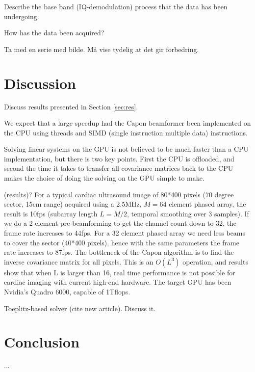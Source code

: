 \documentclass[journal]{IEEEtran}
\begin{document}
Describe the base band (IQ-demodulation) process that the data has been undergoing.

How has the data been acquired?

Ta med en serie med bilde. Må vise tydelig at det gir forbedring. 

\section{Discussion}\label{sec:dis}
Discuss results presented in Section \ref{sec:res}.

We expect that a large speedup had the Capon beamformer been implemented on the CPU using threads and SIMD (single instruction multiple data) instructions. 

Solving linear systems on the GPU is not believed to be much faster than a CPU implementation, but there is two key points. First the CPU is offloaded, and second the time it takes to transfer all covariance matrices back to the CPU makes the choice of doing the solving on the GPU simple to make.

(results)?
For a typical cardiac ultrasound image of 80*400 pixels (70 degree sector, 15cm range) acquired using a 2.5MHz, $M=64$ element phased array, the result is 10fps (subarray length $L=M/2$, temporal smoothing over 3 samples). If we do a 2-element pre-beamforming to get the channel count down to 32, the frame rate increases to 44fps. For a 32 element phased array we need less beams to cover the sector (40*400 pixels), hence with the same parameters the frame rate increases to 87fps. The bottleneck of the Capon algorithm is to find the inverse covariance matrix for all pixels. This is an $O(L^3)$ operation, and results show that when L is larger than 16, real time performance is not possible for cardiac imaging with current high-end hardware. The target GPU has been Nvidia’s Quadro 6000, capable of 1Tflops.

Toeplitz-based solver (cite new article). Discuss it.

\section{Conclusion}\label{sec:con}
...
\end{document}
